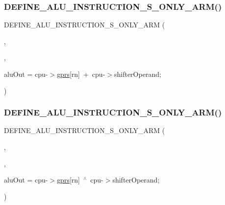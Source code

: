 \subsubsection{\texorpdfstring{D\+E\+F\+I\+N\+E\+\_\+\+A\+L\+U\+\_\+\+I\+N\+S\+T\+R\+U\+C\+T\+I\+O\+N\+\_\+\+S\+\_\+\+O\+N\+L\+Y\+\_\+\+A\+R\+M()}{DEFINE\_ALU\_INSTRUCTION\_S\_ONLY\_ARM()}\hspace{0.1cm}{\footnotesize\ttfamily [1/2]}}
{\footnotesize\ttfamily D\+E\+F\+I\+N\+E\+\_\+\+A\+L\+U\+\_\+\+I\+N\+S\+T\+R\+U\+C\+T\+I\+O\+N\+\_\+\+S\+\_\+\+O\+N\+L\+Y\+\_\+\+A\+RM (\begin{DoxyParamCaption}\item[{C\+MN}]{,  }\item[{\mbox{\hyperlink{isa-arm_8c_a103147682143be92dabcad1fe5413934}{A\+R\+M\+\_\+\+A\+D\+D\+I\+T\+I\+O\+N\+\_\+S}}(cpu-\/$>$\mbox{\hyperlink{isa-thumb_8c_a6b4b7e13a9a144391615b217c5917bc7}{gprs}}\mbox{[}rn\mbox{]}, cpu-\/$>$shifter\+Operand, \mbox{\hyperlink{isa-arm_8c_abb37005c27e4a13f1e19fb44cb8288cb}{alu\+Out}})}]{,  }\item[{int32\+\_\+t}]{alu\+Out = {\ttfamily cpu-\/$>$\mbox{\hyperlink{isa-thumb_8c_a6b4b7e13a9a144391615b217c5917bc7}{gprs}}\mbox{[}rn\mbox{]}~+~cpu-\/$>$shifterOperand;} }\end{DoxyParamCaption})}

\mbox{\label{isa-arm_8c_ac2ed49ca99a52a2764bcd8dfc18a5de6}} 
\subsubsection{\texorpdfstring{D\+E\+F\+I\+N\+E\+\_\+\+A\+L\+U\+\_\+\+I\+N\+S\+T\+R\+U\+C\+T\+I\+O\+N\+\_\+\+S\+\_\+\+O\+N\+L\+Y\+\_\+\+A\+R\+M()}{DEFINE\_ALU\_INSTRUCTION\_S\_ONLY\_ARM()}\hspace{0.1cm}{\footnotesize\ttfamily [2/2]}}
{\footnotesize\ttfamily D\+E\+F\+I\+N\+E\+\_\+\+A\+L\+U\+\_\+\+I\+N\+S\+T\+R\+U\+C\+T\+I\+O\+N\+\_\+\+S\+\_\+\+O\+N\+L\+Y\+\_\+\+A\+RM (\begin{DoxyParamCaption}\item[{T\+EQ}]{,  }\item[{\mbox{\hyperlink{isa-arm_8c_ae0c54b99e326604c0849bad3030d8066}{A\+R\+M\+\_\+\+N\+E\+U\+T\+R\+A\+L\+\_\+S}}(cpu-\/$>$\mbox{\hyperlink{isa-thumb_8c_a6b4b7e13a9a144391615b217c5917bc7}{gprs}}\mbox{[}rn\mbox{]}, cpu-\/$>$shifter\+Operand, \mbox{\hyperlink{isa-arm_8c_abb37005c27e4a13f1e19fb44cb8288cb}{alu\+Out}})}]{,  }\item[{int32\+\_\+t}]{alu\+Out = {\ttfamily cpu-\/$>$\mbox{\hyperlink{isa-thumb_8c_a6b4b7e13a9a144391615b217c5917bc7}{gprs}}\mbox{[}rn\mbox{]}~$^\wedge$~cpu-\/$>$shifterOperand;} }\end{DoxyParamCaption})}

